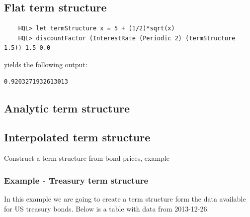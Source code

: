 \documentclass[11pt,a4paper]{article}
\numberwithin{equation}{section}
\begin{document}
	\subsection{Flat term structure}
	\begin{lstlisting}
	HQL> let termStructure x = 5 + (1/2)*sqrt(x)
	HQL> discountFactor (InterestRate (Periodic 2) (termStructure 1.5)) 1.5 0.0
	\end{lstlisting}

	yields the following output:
	\FrameSep

	\begin{lstlisting}[style=Output]
	0.9203271932613013
	\end{lstlisting}

	\subsection{Analytic term structure}

	\subsection{Interpolated term structure}
	Construct a term structure from bond prices, example

	\subsubsection{Example - Treasury term structure}
	In this example we are going to create a term structure form the data available for
	US treasury bonds. Below is a table with data from 2013-12-26.



\end{document}
